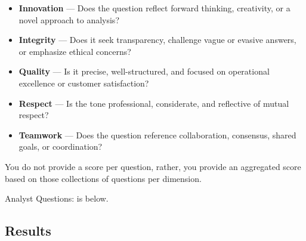 \documentclass[10pt]{article}
\begin{document}
\begin{itemize}
\item \textbf{Innovation} — Does the question reflect forward thinking, creativity, or a novel approach to analysis?
\item \textbf{Integrity} — Does it seek transparency, challenge vague or evasive answers, or emphasize ethical concerns?
\item \textbf{Quality} — Is it precise, well-structured, and focused on operational excellence or customer satisfaction?
\item \textbf{Respect} — Is the tone professional, considerate, and reflective of mutual respect?
\item \textbf{Teamwork} — Does the question reference collaboration, consensus, shared goals, or coordination?
\end{itemize}

You do not provide a score per question, rather, you provide an aggregated score based on those collections of questions per dimension.

Analyst Questions: is below.

\subsection{Results}


\end{document}
